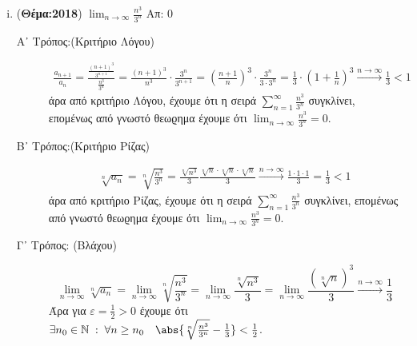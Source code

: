 \begin{enumerate}
\begin{enumerate}[i)]
    \item ({\bfseries Θέμα:2018}) $ \lim_{n \to \infty} \frac{n^{3}}{3^{n}} $ 
        \hfill Απ: $ 0 $
        \begin{description}
            \item [Α᾽ Τρόπος:(Κριτήριο Λόγου)]
                \begin{align*}
                    \frac{a_{n+1}}{a_{n}} = 
                    \frac{\frac{(n+1)^{3}}{3^{n+1}}}{\frac{n^{3}}{3^{n}}} = 
                    \frac{(n+1)^{3}}{n^{3}} \cdot \frac{3^{n}}{3^{n+1}} = 
                    \left(\frac{n+1}{n} \right)^{3} \cdot \frac{3^{n}}{3\cdot 3^{n}} = 
                    \frac{1}{3} \cdot \left(1 + \frac{1}{n}\right)^{3} 
                        \xrightarrow{n \to \infty} \frac{1}{3} < 1
                    \end{align*}
                    άρα από κριτήριο Λόγου, έχουμε ότι η σειρά 
                    $ \sum_{n=1}^{\infty} \frac{n^{3}}{3^{n}} $ συγκλίνει, επομένως 
                    από γνωστό θεωϱημα έχουμε ότι $ \lim_{n \to \infty} 
                    \frac{n^{3}}{3^{n}} = 0 $.

                \item [Β᾽ Τρόπος:(Κριτήριο Ρίζας)]
                    \begin{align*}
                        \sqrt[n]{a_{n}} = \sqrt[n]{\frac{n^{3}}{3^{n}}} = 
                        \frac{\sqrt[n]{n^{3}}}{3} \frac{\sqrt[n]{n} 
                            \cdot \sqrt[n]{n} \cdot \sqrt[n]{n}
                        }{3} \xrightarrow{n \to \infty} \frac{1 \cdot 1 \cdot 1}{3} = 
                        \frac{1}{3} < 1
                    \end{align*}
                    άρα από κριτήριο Ρίζας, έχουμε ότι η σειρά 
                    $ \sum_{n=1}^{\infty} \frac{n^{3}}{3^{n}} $ συγκλίνει, επομένως 
                    από γνωστό θεωϱημα έχουμε ότι $ \lim_{n \to \infty} 
                    \frac{n^{3}}{3^{n}} = 0 $.

                \item [Γ᾽ Τρόπος: (Βλάχου)]
                    \[
                        \lim_{n \to \infty} \sqrt[n]{a_{n}} = \lim_{n \to \infty} 
                        \sqrt[n]{\frac{n^{3}}{3^{n}}} = \lim_{n \to \infty} 
                        \frac{\sqrt[n]{n^{3}}}{3} = \lim_{n \to \infty} 
                        \frac{(\sqrt[n]{n})^{3}}{3} \xrightarrow{n \to \infty} 
                        \frac{1}{3}  
                    \] 
                    Άρα για $ \varepsilon = \frac{1}{2} >0 $ έχουμε ότι $ \exists n_{0} 
                    \in \mathbb{N} \; : \; \forall n \geq n_{0} \quad 
                    \abs{\sqrt[n]{\frac{n^{3}}{3^{n}}} - \frac{1}{3}} < 
                    \frac{1}{2} $.


\end{description}
\end{enumerate}
\end{enumerate}
